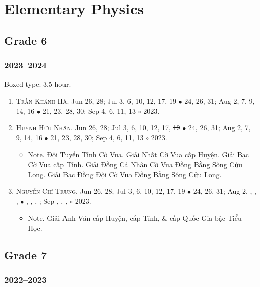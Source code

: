 \documentclass{article}
\begin{document}

\section{Elementary Physics}

\subsection{Grade 6}

\subsubsection{2023--2024}
Boxed-type: 3.5 hour.
\begin{enumerate}
	\item \textsc{Trần Khánh Hà.} {\sf[In]} Jun 26, 28; Jul 3, 6, \st{10}, 12, \st{17}, 19 $\bullet$ 24, 26, 31; Aug 2, 7, \st{9}, 14, 16 $\bullet$ \st{21}, 23, 28, 30; Sep 4, 6, 11, 13 $\circ$ 2023. 
	\item \textsc{Huỳnh Hữu Nhân.} {\sf[In]} Jun 26, 28; Jul 3, 6, 10, 12, 17, \st{19} $\bullet$ 24, 26, 31; Aug 2, 7, 9, 14, 16 $\bullet$ 21, 23, 28, 30; Sep 4, 6, 11, 13 $\circ$ 2023.
	\begin{itemize}
		\item {\sf Note.} Đội Tuyển Tỉnh Cờ Vua. Giải Nhất Cờ Vua cấp Huyện. Giải Bạc Cờ Vua cấp Tỉnh. Giải Đồng Cá Nhân Cờ Vua Đồng Bằng Sông Cửu Long. Giải Bạc Đồng Đội Cờ Vua Đồng Bằng Sông Cửu Long.
	\end{itemize}
	\item \textsc{Nguyễn Chí Trung.} {\sf[In]} Jun 26, 28; Jul 3, 6, 10, 12, 17, 19 $\bullet$ 24, 26, 31; Aug 2, , , ,  $\bullet$ , , , ; Sep , , ,  $\circ$ 2023.
	\begin{itemize}
		\item {\sf Note.} Giải Anh Văn cấp Huyện, cấp Tỉnh, \& cấp Quốc Gia bậc Tiểu Học.
	\end{itemize}
\end{enumerate}

\subsection{Grade 7}

\subsubsection{2022--2023}
\end{document}
